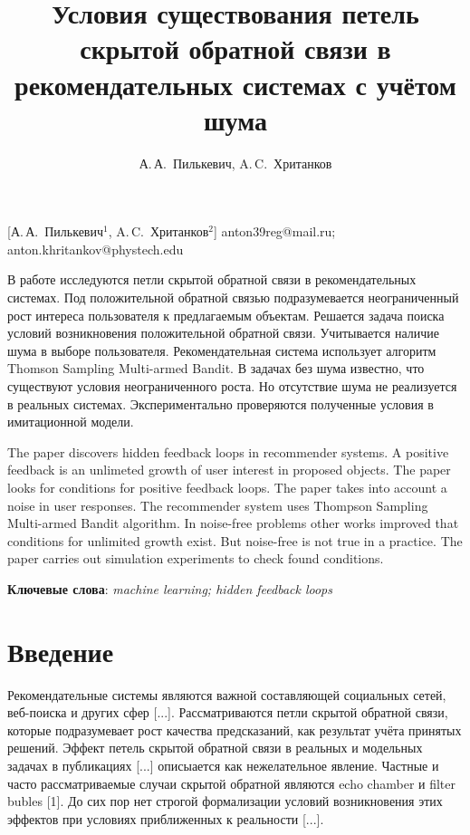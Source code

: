 \documentclass[12pt, twoside]{article}
\begin{document}
\title
    [] %
    {Условия существования петель скрытой обратной связи в рекомендательных системах с учётом шума}
\author
    [А.\,А.~Пилькевич] %
    {А.\,А.~Пилькевич, A.\,C.~Хританков} %
    [А.\,А.~Пилькевич$^1$, A.\,C.~Хританков$^2$] %
\email
   {anton39reg@mail.ru; anton.khritankov@phystech.edu}
\abstract
  {В работе исследуются петли скрытой обратной связи в рекомендательных системах.
  Под положительной обратной связью подразумевается неограниченный рост интереса пользователя к предлагаемым объектам. 
  Решается задача поиска условий возникновения положительной обратной связи. 
  Учитывается наличие шума в выборе пользователя.
  Рекомендательная система использует алгоритм Thomson Sampling Multi-armed Bandit.
  В задачах без шума известно, что существуют условия неограниченного роста. 
  Но отсутствие шума не реализуется в реальных системах.
  Экспериментально проверяются полученные условия в имитационной модели.

\bigskip
  The paper discovers hidden feedback loops in recommender systems. 
  A positive feedback is an unlimeted growth of user interest in proposed objects.
  The paper looks for conditions for positive feedback loops. 
  The paper takes into account a noise in user responses.
  The recommender system uses Thompson Sampling Multi-armed Bandit algorithm.
  In noise-free problems other works improved that conditions for unlimited growth exist.
  But noise-free is not true in a practice.
  The paper carries out simulation experiments to check found conditions.

\bigskip
\noindent
\textbf{Ключевые слова}: \emph {machine learning; hidden feedback loops}
}
\doi{}
\receivedRus{}
\receivedEng{}

\maketitle
\linenumbers
\section{Введение}
Рекомендательные системы являются важной составляющей социальных сетей, веб-поиска и других сфер [...]. 
Рассматриваются петли скрытой обратной связи, которые подразумевает рост качества предсказаний, как результат учёта принятых решений. 
Эффект петель скрытой обратной связи в реальных и модельных задачах в  публикациях [...] описыается как нежелательное явление. 
Частные и часто рассматриваемые случаи скрытой обратной являются echo chamber и filter bubles [1].
До сих пор нет строгой формализации условий возникновения этих эффектов при условиях приближенных к реальности [...]. 
\end{document}
